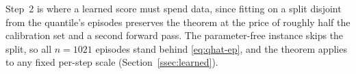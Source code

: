 \begin{remark}
\label{rem:paramfree}
Step~2 is where a learned score must spend data, since fitting on a split
disjoint from the quantile's episodes preserves the theorem at the price of
roughly half the calibration set and a second forward pass. The
parameter-free instance skips the split, so all $n=1021$ episodes stand
behind \eqref{eq:qhat-ep}, and the theorem applies to any fixed per-step
scale (Section~\ref{ssec:learned}).
\end{remark}
